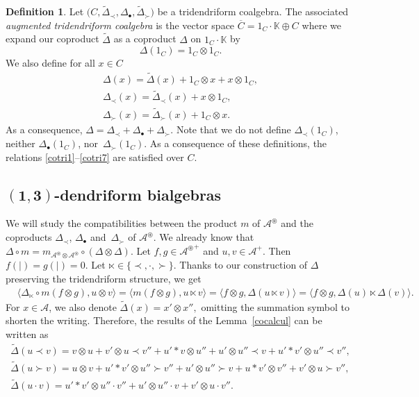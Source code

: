 \documentclass[pdftex]{sigma}
\numberwithin{equation}{section}
\theoremstyle{definition}
\newtheorem{defi}{Definition}[section]
\theoremstyle{plain}
\newcommand{\K}{\mathbb{K}}
\begin{document}
\begin{defi}
	Let $\bigl(C,\tilde{\Delta}_{\prec},\Delta_{\bullet},\tilde{\Delta}_{\succ}\bigr)$ be a tridendriform coalgebra.
	The associated \emph{augmented tridendriform coalgebra} is the vector space $\overline{C}=1_C\cdot\K\oplus C$ where we expand our coproduct $\tilde{\Delta}$ as a coproduct $\Delta$ on $1_C\cdot\K$ by
	\[
	\Delta(1_C)=1_C\otimes 1_C.
	\]
	We also define for all $x\in C$
	\begin{gather*}
		\Delta(x)=\tilde{\Delta}(x)+1_C\otimes x+x\otimes 1_C, \\
		\Delta_{\prec}(x)=\tilde{\Delta}_{\prec}(x)+x\otimes 1_C, \\
		\Delta_{\succ}(x)=\tilde{\Delta}_{\succ}(x)+1_C\otimes x.
	\end{gather*}	
As a consequence, $\Delta=\Delta_{\prec}+\Delta_{\bullet}+\Delta_{\succ}.$
Note that we do not define $\Delta_{\prec}(1_C)$, neither $\Delta_{\bullet}(1_C)$, nor~$\Delta_{\succ}(1_C)$. As a consequence of these definitions, the relations \eqref{cotri1}--\eqref{cotri7} are satisfied over $C$.
\end{defi}

\subsection[(1,3)-dendriform bialgebras]{$\boldsymbol{(1,3)}$-dendriform bialgebras}

We will study the compatibilities between the product $m$ of $\mathcal{A}^{\circledast}$ and the coproducts $\Delta_{\prec}$, $\Delta_{\bullet}$ and~$\Delta_{\succ}$ of $\mathcal{A}^{\circledast}$. We already know that $\Delta \circ m=m_{\mathcal{A}^{\circledast}\otimes \mathcal{A}^{\circledast}}\circ (\Delta \otimes \Delta)$. Let $f,g\in{\mathcal{A}^{\circledast}}^+$ and $u,v\in \mathcal{A}^+$. Then $f(|)=g(|)=0$. Let $\ltimes\in\{\prec,\cdot,\succ\}$.
Thanks to our construction of $\Delta$ preserving the tridendriform structure, we get
\begin{align*}
	& \langle \Delta_{\ltimes}\circ m(f\otimes g),u\otimes v \rangle= \langle m(f\otimes g), u\ltimes v \rangle
	= \langle f\otimes g,\Delta(u\ltimes v) \rangle
	= \langle f\otimes g,\Delta(u)\ltimes \Delta(v) \rangle.
\end{align*}
For $x\in \mathcal{A}$, we also denote $\tilde{\Delta}(x)=x'\otimes x'',$ omitting the summation symbol to shorten the writing.
Therefore, the results of the Lemma~\ref{cocalcul} can be written as
\begin{gather*}
\tilde{\Delta}(u\prec v)=v\otimes u+v'\otimes u\prec v''+u'*v\otimes u''+u'\otimes u''\prec v+u'*v'\otimes u''\prec v'', \\
\tilde{\Delta}(u\succ v)=u\otimes v+u'*v'\otimes u''\succ v'' +u'\otimes u''\succ v+u*v'\otimes v''+v'\otimes u\succ v'',\\
\tilde{\Delta}(u\cdot v)=u'*v'\otimes u''\cdot v'' +u'\otimes u''\cdot v + v'\otimes u\cdot v''.
\end{gather*}
\end{document}
